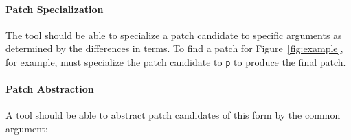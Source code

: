 \paragraph{Patch Specialization} The tool should be able to specialize a patch candidate to specific arguments as determined by
the differences in terms. To find a patch for Figure~\ref{fig:example}, for example, \sysname
must specialize the patch candidate to \lstinline{p} to produce the final patch.









\paragraph{Patch Abstraction} A tool should be able to abstract patch candidates of this form by the common argument:

